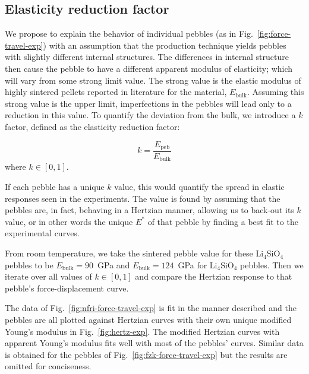 \subsection{Elasticity reduction factor}
We propose to explain the behavior of individual pebbles (as in Fig.~\ref{fig:force-travel-exp}) with an assumption that the production technique yields pebbles with slightly different internal structures. The differences in internal structure then cause the pebble to have a different apparent modulus of elasticity; which will vary from some strong limit value. The strong value is the elastic modulus of highly sintered pellets reported in literature for the material, $E_\text{bulk}$. Assuming this strong value is the upper limit, imperfections in the pebbles will lead only to a reduction in this value. To quantify the deviation from the bulk, we introduce a $k$ factor, defined as the elasticity reduction factor:

\begin{equation}
  k = \frac{E_\text{peb}}{E_\text{bulk}}
\end{equation}
where $k \in [0,1]$.

If each pebble has a unique $k$ value, this would quantify the spread in elastic responses seen in the experiments. The value is found by assuming that the pebbles are, in fact, behaving in a Hertzian manner, allowing us to back-out its $k$ value, or in other words the unique $E^*$ of that pebble by finding a best fit to the experimental curves. 

From room temperature, we take the sintered pebble value for these Li$_4$SiO$_4$ pebbles to be $E_\text{bulk} = 90$~GPa and $E_\text{bulk} = 124$~GPa for Li$_4$SiO$_4$ pebbles. Then we iterate over all values of $k\in[0,1]$ and compare the Hertzian response to that pebble's force-displacement curve.

The data of Fig.~\ref{fig:nfri-force-travel-exp} is fit in the manner described and the pebbles are all plotted against Hertzian curves with their own unique modified Young's modulus in Fig.~\ref{fig:hertz-exp}. The modified Hertzian curves with apparent Young's modulus fits well with most of the pebbles' curves. Similar data is obtained for the pebbles of Fig.~\ref{fig:fzk-force-travel-exp} but the results are omitted for conciseness.


       
